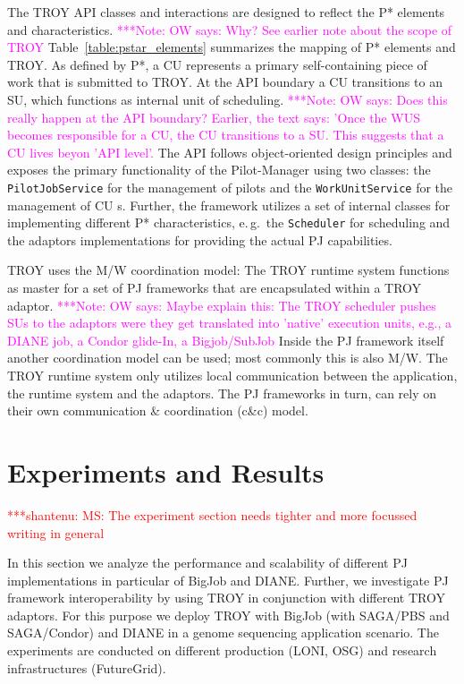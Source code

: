 \documentclass[conference,final]{IEEEtran}
\newcommand{\jhanote}[1]{ {\textcolor{red} { ***shantenu: #1 }}}
\newcommand{\note}[1]{ {\textcolor{magenta} { ***Note: #1 }}}
\newcommand{\jhanote}[1]{}
\newcommand{\note}[1]{}
\newcommand{\cu}{CU\xspace}
\newcommand{\upp}{\vspace*{-0.5em}}
\begin{document}
The TROY API classes and interactions are designed to reflect the P*
elements and characteristics.
\note{OW says: Why? See earlier note about the scope of TROY}
Table~\ref{table:pstar_elements}
summarizes the mapping of P* elements and TROY. As defined by P*, a \cu 
represents a primary self-containing piece of work that is submitted
to TROY. At the API boundary a \cu  transitions to an SU, which
functions as internal unit of scheduling.
\note{OW says: Does this really happen at the API boundary? Earlier, 
the text says: 'Once the WUS becomes responsible for a CU, the CU
transitions to a SU. This suggests that a CU lives beyon 'API level'.}
The API follows
object-oriented design principles and exposes the primary
functionality of the Pilot-Manager using two classes: the
\texttt{PilotJobService} for the management of pilots and the
\texttt{WorkUnitService} for the management of \cu s. Further, the
framework utilizes a set of internal classes for implementing
different P* characteristics, e.\,g.\ the \texttt{Scheduler} for
scheduling and the adaptors implementations for providing the actual
PJ capabilities.

TROY uses the M/W coordination model: The TROY runtime system
functions as master for a set of PJ frameworks that are encapsulated
within a TROY adaptor.
\note{OW says: Maybe explain this: The TROY scheduler pushes SUs
to the adaptors were they get translated into 'native' execution units,
e.g., a DIANE job, a Condor glide-In, a Bigjob/SubJob}
 Inside the PJ framework itself another
coordination model can be used; most commonly this is also M/W. The
TROY runtime system only utilizes local communication between the
application, the runtime system and the adaptors. The PJ frameworks in
turn, can rely on their own communication \& coordination (c\&c)
model.



\section{Experiments and Results\upp\upp}
\label{sec:exp_res}

\jhanote{MS: The experiment section needs tighter and more focussed
  writing in general}

In this section we analyze the performance and scalability of
different PJ implementations in particular of BigJob and
DIANE. Further, we investigate PJ framework interoperability by using
TROY in conjunction with different TROY adaptors. For this purpose we
deploy TROY with BigJob (with SAGA/PBS and SAGA/Condor) and DIANE in a
genome sequencing application scenario. The experiments are conducted
on different production (LONI, OSG) and research infrastructures
(FutureGrid).
\end{document}
